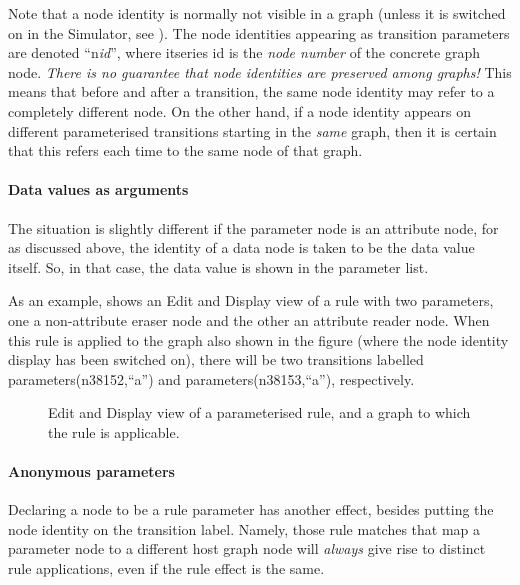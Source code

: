 Note that a node identity is normally not visible in a graph (unless it is
switched on in the Simulator, see ). The node identities
appearing as transition parameters are denoted ``\textsf{n{\itshape id}}'',
where \textsf{itseries id} is the \emph{node number} of the concrete graph
node. \emph{There is no guarantee that node identities are preserved among
graphs!} This means that before and after a transition, the same node identity
may refer to a completely different node. On the other hand, if a node identity
appears on different parameterised transitions starting in the \emph{same}
graph, then it is certain that this refers each time to the same node of that
graph.

\paragraph{Data values as arguments}

The situation is slightly different if the parameter node is an attribute node,
for as discussed above, the identity of a data node is taken to be the data
value itself. So, in that case, the data value is shown in the parameter list.

As an example,  shows an Edit and Display view of a rule with
two parameters, one a non-attribute eraser node and the other an attribute
reader node. When this rule is applied to the graph also shown in the figure
(where the node identity display has been switched on), there will be two
transitions labelled \textsf{parameters(n38152,``a'')} and
\textsf{parameters(n38153,``a'')}, respectively.

\begin{figure}
\begin{center}
 \qquad
{} \qquad
{}
\end{center}
\vspace*{-\medskipamount}
\caption{Edit and Display view of a parameterised rule, and a graph to which
the rule is applicable.}
\end{figure}

\paragraph{Anonymous parameters}

Declaring a node to be a rule parameter has another effect, besides putting the
node identity on the transition label. Namely, those rule matches that map a
parameter node to a different host graph node will \emph{always} give rise to
distinct rule applications, even if the rule effect is the same. 

